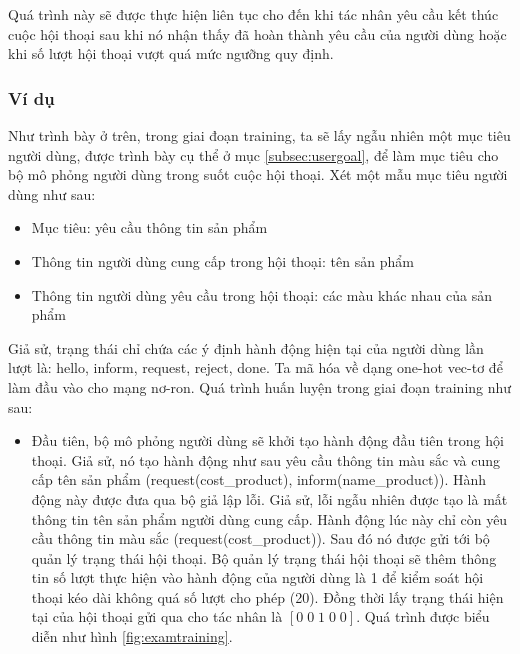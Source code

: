 Quá trình này sẽ được thực hiện liên tục cho đến khi tác nhân yêu cầu
kết thúc cuộc hội thoại sau khi nó nhận thấy đã hoàn thành yêu cầu
của người dùng hoặc khi số lượt hội thoại vượt quá mức ngưỡng quy định.

\subsubsection{Ví dụ}
Như trình bày ở trên, trong giai đoạn training, ta sẽ lấy ngẫu nhiên
một mục tiêu người dùng, được trình bày cụ thể ở mục
\ref{subsec:usergoal}, để làm mục tiêu cho bộ mô phỏng người dùng
trong suốt cuộc hội thoại. Xét một mẫu mục tiêu người dùng như sau:

\begin{itemize}
    \item Mục tiêu: yêu cầu thông tin sản phẩm
    \item Thông tin người dùng cung cấp trong hội thoại: tên sản phẩm
    \item Thông tin người dùng yêu cầu trong hội thoại: các màu
    khác nhau của sản phẩm
\end{itemize}

Giả sử, trạng thái chỉ chứa các ý định hành động hiện tại của
người dùng lần lượt là: hello, inform, request, reject, done.
Ta mã hóa về dạng one-hot vec-tơ để làm đầu vào cho mạng nơ-ron.
Quá trình huấn luyện trong giai đoạn training như sau:

\begin{itemize}
    \item Đầu tiên, bộ mô phỏng người dùng sẽ khởi tạo hành động
    đầu tiên trong hội thoại. Giả sử, nó tạo hành động như sau
    yêu cầu thông tin màu sắc và cung cấp tên sản phẩm
    (request(cost\_product), inform(name\_product)).
    Hành động này được đưa qua bộ giả lập lỗi. Giả sử, lỗi
    ngẫu nhiên được tạo là mất thông tin tên sản phẩm người dùng
    cung cấp. Hành động lúc này chỉ còn yêu cầu thông tin màu sắc
    (request(cost\_product)). Sau đó nó được gửi tới bộ quản lý
    trạng thái hội thoại. Bộ quản lý trạng thái hội thoại sẽ thêm
    thông tin số lượt thực hiện vào hành động của người dùng là 1
    để kiểm soát hội thoại kéo dài không quá số lượt cho phép (20).
    Đồng thời lấy trạng thái hiện tại của hội thoại gửi qua cho
    tác nhân là $[0\; 0\; 1\; 0\; 0]$. Quá trình được biểu diễn
    như hình \ref{fig:examtraining}.
\end{itemize}

